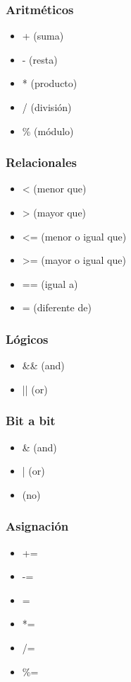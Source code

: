 \documentclass[12pt]{article}
\begin{document}
\subsubsection{Aritm\'eticos}

\begin{itemize}
\item + (suma)
\item - (resta)
\item * (producto)
\item / (divisi\'on)
\item \% (m\'odulo)
\end{itemize}

\subsubsection{Relacionales}

\begin{itemize}
\item < (menor que)
\item > (mayor que)
\item <= (menor o igual que)
\item >= (mayor o igual que)
\item == (igual a)
\item \!= (diferente de)
\end{itemize}

\subsubsection{L\'ogicos}
\begin{itemize}
\item \&\& (and)
\item || (or)
\end{itemize}

\subsubsection{Bit a bit}
\begin{itemize}
\item \& (and)
\item | (or)
\item \! (no)
\end{itemize}

\subsubsection{Asignaci\'on}
\begin{itemize}
\item +=
\item -=
\item =
\item *=
\item /=
\item \%=
\end{itemize}
\end{document}
